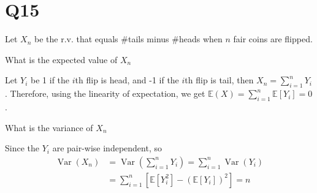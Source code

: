 \documentclass[11pt]{article}
\begin{document}
\section*{Q15}
Let $X_{n}$ be the r.v. that equals \#tails minus \#heads when $n$
fair coins are flipped.
\begin{qparts}
    
    \item What is the expected value of $X_{n}$
    \begin{solution}
        Let $Y_{i}$ be 1 if the $i$th flip is head, and -1 if the $i$th 
        flip is tail, then $X_{n}=\sum_{i=1}^{n }Y_{i}$. Therefore, using the linearity of expectation, we get
        $\mathbb{E}(X)=\sum_{i=1}^{n }\mathbb{E}[Y_{i}]=0$.
    \end{solution}
    \item What is the variance of $X_{n}$
    \begin{solution}
        Since the $Y_{i}$ are pair-wise independent, so 
    \begin{align*}
        \operatorname{Var}(X_{n})&=\operatorname{Var}\left( \sum_{i=1}^{n }Y_{i} \right)=\sum_{i=1}^{n }\operatorname{Var}(Y_{i })\\
        &=\sum_{i=1}^{n }\left[ \mathbb{E}\left[ Y_{i }^{2} \right]-\left(\mathbb{E}\left[ Y_{i} \right] \right)^{2}   \right]=n
    \end{align*}
    \end{solution}
    
\end{qparts}
\end{document}
